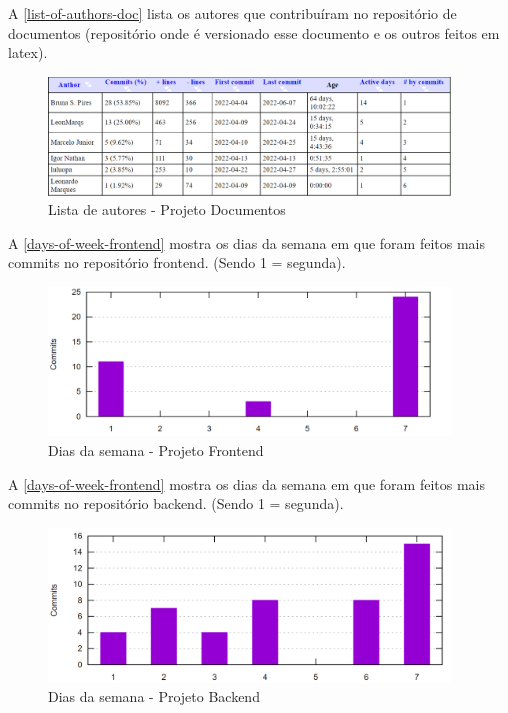 A \autoref{list-of-authors-doc} lista os autores que contribuíram no repositório de documentos (repositório onde é versionado esse documento e os outros feitos em latex).
\begin{figure}[H]
	\centering
	\caption{\label{list-of-authors-doc}Lista de autores - Projeto Documentos}
	\includegraphics[width=0.95\textwidth]{../imagens/stats/list-of-authors-documentos.png}
\end{figure}

A \autoref{days-of-week-frontend} mostra os dias da semana em que foram feitos mais commits no repositório frontend. (Sendo 1 = segunda).
\begin{figure}[H]
	\centering
	\caption{\label{days-of-week-frontend}Dias da semana - Projeto Frontend}
	\includegraphics[width=0.95\textwidth]{../imagens/stats/days-of-week-frontend.png}
\end{figure}

A \autoref{days-of-week-frontend} mostra os dias da semana em que foram feitos mais commits no repositório backend. (Sendo 1 = segunda).
\begin{figure}[H]
	\centering
	\caption{\label{days-of-week-backend}Dias da semana - Projeto Backend}
	\includegraphics[width=0.95\textwidth]{../imagens/stats/days-of-week-backend.png}
\end{figure}